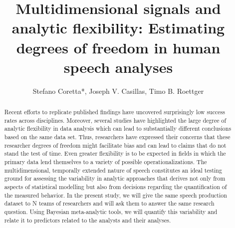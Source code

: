 \documentclass[Review,times,sageh]{sagej}
\begin{document}
\title{Multidimensional signals and analytic flexibility: Estimating degrees of freedom in human speech analyses}


\author{Stefano Coretta*, Joseph V. Casillas, Timo B. Roettger}




\begin{abstract}
Recent efforts to replicate published findings have uncovered surprisingly low success rates across disciplines. Moreover, several studies have highlighted the large degree of analytic flexibility in data analysis which can lead to substantially different conclusions based on the same data set. Thus, researchers have expressed their concerns that these researcher degrees of freedom might facilitate bias and can lead to claims that do not stand the test of time. Even greater flexibility is to be expected in fields in which the primary data lend themselves to a variety of possible operationalizations. The multidimensional, temporally extended nature of speech constitutes an ideal testing ground for assessing the variability in analytic approaches that derives not only from aspects of statistical modelling but also from decisions regarding the quantification of the measured behavior. In the present study, we will give the same speech production dataset to N teams of researchers and will ask them to answer the same research question. Using Bayesian meta-analytic tools, we will quantify this variability and relate it to predictors related to the analysts and their analyses.
\end{abstract}


\maketitle
\end{document}
